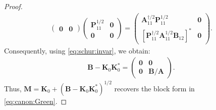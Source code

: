 \documentclass[noinfoline]{imsart}\setcounter{tocdepth}{2}
\newcommand{\m}[1]{\mathbf{#1}}
\theoremstyle{plain}
\begin{document}
\begin{proof}
\begin{align*}
\begin{pmatrix}
    \m{0} & \m{0}
    \end{pmatrix} \begin{pmatrix}
    \m{P}_{11}^{1/2} & \m{0} \\
    \m{0} & \m{0}
    \end{pmatrix} = \begin{pmatrix}
    \m{A}_{11}^{\dagger/2} \m{P}_{11}^{1/2} & \m{0} \\
    [\m{P}_{11}^{\dagger/2} \m{A}_{{11}}^{1/2} \m{B}_{{12}}]^{*} & \m{0}
    \end{pmatrix}.
\end{align*}
Consequently, using \eqref{eq:schur:invar}, we obtain:
\begin{align*}
    \m{B} - \m{K}_{0} \m{K}_{0}^{*} = \begin{pmatrix}
    \m{0} & \m{0} \\
    \m{0} & \m{B}/\m{A}
    \end{pmatrix}.
\end{align*}
Thus, $\m{M} = \m{K}_{0} + (\m{B} - \m{K}_{0} \m{K}_{0}^{*})^{1/2}$ recovers the block form in \eqref{eq:canon:Green}.
\end{proof}
\end{document}
